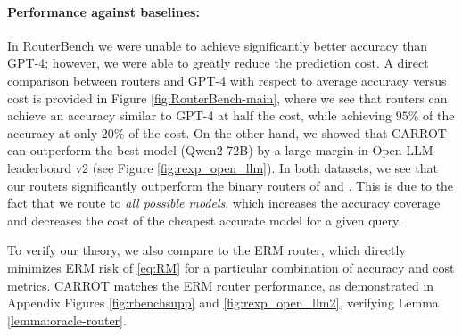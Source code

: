 \paragraph{Performance against baselines:} In {RouterBench} we were unable to achieve significantly better accuracy than GPT-4; however, we were able to greatly reduce the prediction cost. A direct comparison between routers and GPT-4 with respect to average accuracy versus cost is provided in Figure \ref{fig:RouterBench-main}, where we see that routers can achieve an accuracy similar to GPT-4 at half the cost, while achieving $95\%$ of the accuracy at only $20\%$ of the cost. On the other hand, we showed that CARROT can outperform the best model (Qwen2-72B) by a large margin in {Open LLM leaderboard v2} (see Figure \ref{fig:rexp_open_llm}). In both datasets, we see that our routers significantly outperform the binary routers of \citet{ong2024routellmlearningroutellms} and \citet{notdiamond2023rorf}. This is due to the fact that we route to \emph{all possible models}, which increases the accuracy coverage and decreases the cost of the cheapest accurate model for a given query.


To verify our theory, we also compare to the ERM router, which directly minimizes ERM risk of \eqref{eq:RM} for a particular combination of accuracy and cost metrics. CARROT matches the ERM router performance, as demonstrated in Appendix Figures \ref{fig:rbenchsupp} and \ref{fig:rexp_open_llm2}, verifying Lemma \ref{lemma:oracle-router}.%


